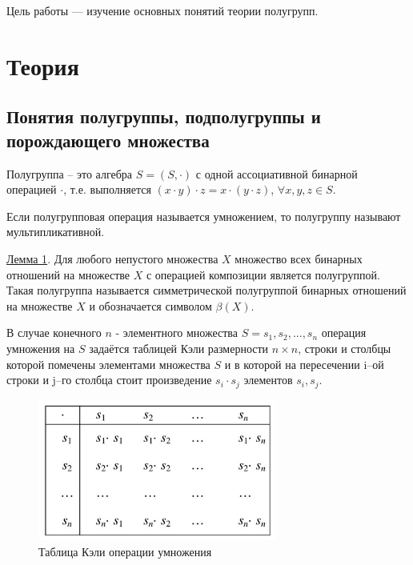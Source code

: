 \documentclass[bachelor, och, labwork]{shiza}
\begin{document}
	
	
	\tableofcontents
	
	\newpage
	
	Цель работы — изучение основных понятий теории полугрупп.
	
	\section{Теория}
	    \subsection{Понятия полугруппы, подполугруппы и порождающего множества}

	Полугруппа – это алгебра $S = (S,\cdot)$ с одной ассоциативной бинарной операцией $\cdot$, т.е. выполняется $(x\cdot y)\cdot z = x\cdot (y\cdot z)$, $\forall x,y,z \in S$.

	Если полугрупповая операция называется умножением, то полугруппу называют мультипликативной.

	\underline{Лемма 1}. Для любого непустого множества $X$ множество всех бинарных отношений на множестве $X$ с операцией композиции является полугруппой. Такая полугруппа называется симметрической полугруппой бинарных отношений на множестве $X$ и обозначается символом $\beta(X)$.
	
	В случае конечного $n$ - элементного множества $S = {s_1,s_2,...,s_n}$ операция умножения на $S$ задаётся таблицей Кэли размерности $n \times n$, строки и столбцы которой помечены элементами множества $S$ и в которой на пересечении i–ой строки и j–го столбца стоит произведение $s_i \cdot s_j$ элементов $s_i, s_j$.
	
	\begin{figure}[H]
		\centering
		\includegraphics[width=0.7\textwidth]{keli}
		\caption{Таблица Кэли операции умножения}
		\label{fig:keli}
	\end{figure}
	
\end{document}
